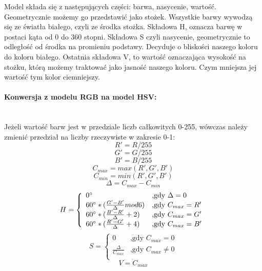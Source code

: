 \documentclass[a4paper,12pt,twoside,openany]{report}
\begin{document}
Model składa się z następujących części: barwa, nasycenie, wartość. Geometrycznie możemy go przedstawić jako stożek. Wszystkie barwy wywodzą się ze światła białego, czyli ze środka stożka. Składowa H, oznacza barwę w postaci kąta od 0 do 360 stopni. Składowa S czyli nasycenie, geometrycznie to odległość od środka na promieniu podstawy. Decyduje o bliskości naszego koloru do koloru białego. Ostatnia składowa V, to wartość oznaczająca wysokość na stożku, którą możemy traktować jako jasność naszego koloru. Czym mniejsza jej wartość tym kolor ciemniejszy\cite{Jankowski}.

\paragraph{Konwersja z modelu RGB na model HSV: \cite{rgbhsv}} \mbox{} \\ 
\indent
Jeżeli wartość barw jest w przedziale liczb całkowitych 0-255, wówczas należy zmienić przedział na liczby rzeczywiste w zakresie 0-1: 
\begin{equation}
	 R' = R/255 
\end{equation}
\begin{equation}
	 G' = G/255 
\end{equation}
\begin{equation}
	 B' = B/255 
\end{equation}
\begin{equation}
	 C_{max} = max(R', G', B')
\end{equation}
\begin{equation} 
	 C_{min} = min(R', G', B')
\end{equation}
\begin{equation} 
	 \Delta = C_{max}-C_{min} 
\end{equation}
\begin{equation}
		H = \left\{ \begin{array}{ll}
		0 \degree & \mbox{,gdy }\Delta = 0 \\
		60 \degree * (\frac{G'-B'}{\Delta}mod6)& \mbox{,gdy }C_{max} = R' \\
		60 \degree * (\frac{B'-R'}{\Delta}+2)& \mbox{,gdy }C_{max} = G' \\
		60 \degree *  (\frac{R'-G'}{\Delta}+4)& \mbox{,gdy }C_{max} = B' \\
		\end{array} \right. 
\end{equation}
\begin{equation}
		S = \left\{ \begin{array}{ll}
		0  & \mbox{,gdy } C_{max} = 0 \\
		\frac{\Delta}{C_{max}} & \mbox{,gdy }C_{max} \neq 0 \\
		\end{array} \right. 
\end{equation}
\begin{equation}
	 V = C_{max} 
\end{equation}
\end{document}
